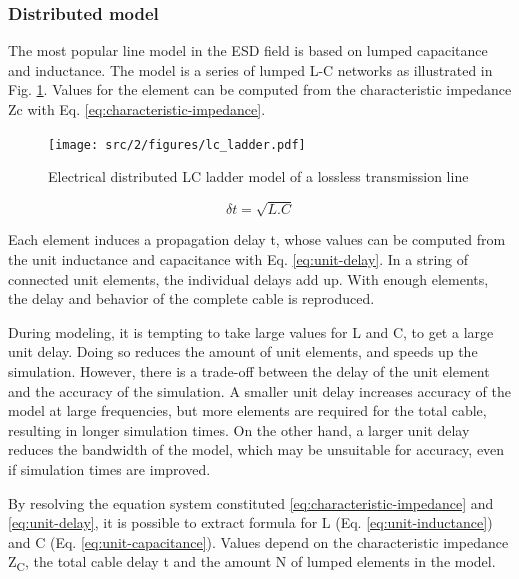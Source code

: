 \subsubsection{Distributed model}

The most popular line model in the ESD field is based on lumped capacitance and inductance.
The model is a series of lumped L-C networks as illustrated in Fig. \ref{fig:dis-line-model}.
Values for the element can be computed from the characteristic impedance \gls{Zc} with Eq. \ref{eq:characteristic-impedance}.

\begin{figure}[!h]
  \centering
  \texttt{[image: src/2/figures/lc\_ladder.pdf]}
  \caption{Electrical distributed LC ladder model of a lossless transmission line}
  \label{fig:dis-line-model}
\end{figure}

\begin{equation}
\delta t = \sqrt{L.C}
\label{eq:unit-delay}
\end{equation}

Each element induces a propagation delay \textdelta{}t, whose values can be computed from the unit inductance and capacitance with Eq. \ref{eq:unit-delay}.
In a string of connected unit elements, the individual delays add up.
With enough elements, the delay and behavior of the complete cable is reproduced.

During modeling, it is tempting to take large values for \textdelta{}L and \textdelta{}C, to get a large unit delay.
Doing so reduces the amount of unit elements, and speeds up the simulation.
However, there is a trade-off between the delay of the unit element and the accuracy of the simulation.
A smaller unit delay increases accuracy of the model at large frequencies, but more elements are required for the total cable, resulting in longer simulation times.
On the other hand, a larger unit delay reduces the bandwidth of the model, which may be unsuitable for accuracy, even if simulation times are improved.

By resolving the equation system constituted \ref{eq:characteristic-impedance} and \ref{eq:unit-delay}, it is possible to extract formula for L (Eq. \ref{eq:unit-inductance}) and C (Eq. \ref{eq:unit-capacitance}).
Values depend on the characteristic impedance Z\textsubscript{C}, the total cable delay \textDelta{}t and the amount N of lumped elements in the model.

